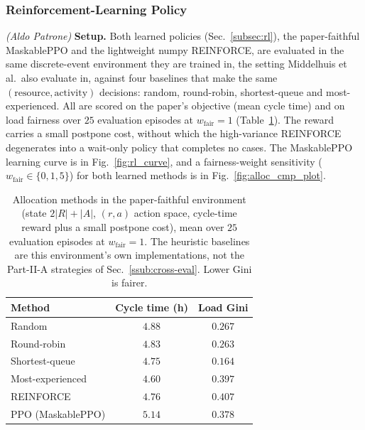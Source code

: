 \subsubsection{Reinforcement-Learning Policy}\label{ssub:rl-eval}
\textit{(Aldo Patrone)}\quad
\textbf{Setup.} Both learned policies (Sec.~\ref{subsec:rl}), the paper-faithful MaskablePPO and the
lightweight numpy REINFORCE, are evaluated in the same discrete-event environment they are trained
in, the setting Middelhuis et al.\ also evaluate in, against four baselines that make the same
$(\text{resource},\text{activity})$ decisions: random, round-robin, shortest-queue and
most-experienced. All are scored on the paper's objective (mean cycle time) and on load fairness over
$25$ evaluation episodes at $w_{\mathrm{fair}}=1$ (Table~\ref{tab:alloc_sim}). The reward carries a
small postpone cost, without which the high-variance REINFORCE degenerates into a wait-only policy
that completes no cases. The MaskablePPO learning curve is in
Fig.~\ref{fig:rl_curve}, and a fairness-weight sensitivity ($w_{\mathrm{fair}}\in\{0,1,5\}$) for both
learned methods is in Fig.~\ref{fig:alloc_cmp_plot}.

\begin{table}[!h]
    \caption{Allocation methods in the paper-faithful environment (state $2|R|+|A|$, $(r,a)$ action
    space, cycle-time reward plus a small postpone cost), mean over $25$ evaluation episodes at
    $w_{\mathrm{fair}}=1$. The heuristic baselines are this environment's own implementations, not the
    Part-II-A strategies of Sec.~\ref{ssub:cross-eval}. Lower Gini is fairer.}
    \centering
    \renewcommand{\arraystretch}{1.2}
    \footnotesize
    \begin{tabular}{lcc}
        \toprule
        \textbf{Method} & \textbf{Cycle time (h)} & \textbf{Load Gini} \\
        \midrule
        Random            & $4.88$ & $0.267$ \\
        Round-robin       & $4.83$ & $0.263$ \\
        Shortest-queue    & $4.75$ & $\mathbf{0.164}$ \\
        Most-experienced  & $4.60$ & $0.397$ \\
        REINFORCE         & $4.76$ & $0.407$ \\
        PPO (MaskablePPO) & $5.14$ & $0.378$ \\
        \bottomrule
    \end{tabular}
    \label{tab:alloc_sim}
\end{table}

